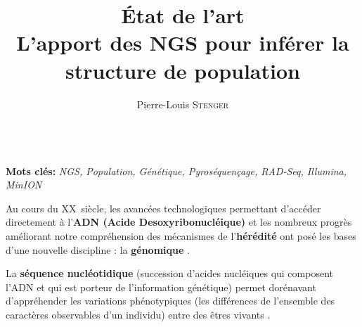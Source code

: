 \documentclass[a4paper,11pt,twoside]{report}
\title{{\Huge État de l'art}\\[3pc]L'apport des NGS pour inférer la structure de population}
\author{Pierre-Louis \textsc{Stenger}}
\date{}
\begin{document}
	
\onehalfspacing %



\frontmatter

\maketitle 

\listoffigures  %

\mainmatter





~~\\
\textbf{Mots clés:} \emph{NGS, Population, Génétique, Pyroséquençage, RAD-Seq, Illumina, MinION}
~~\\

\newpage

Au cours du \textsc{XX}\ieme~siècle, les avancées technologiques permettant d’accéder directement à l’\textbf{ADN (Acide Desoxyribonucléique)} et les nombreux progrès améliorant notre compréhension des mécanismes de l’\textbf{hérédité} ont posé les bases d’une nouvelle discipline : la \textbf{génomique} \citep{eggen2003approches}. 

La \textbf{séquence nucléotidique} (succession d'acides nucléiques qui composent l'ADN et qui est porteur de l'information génétique) permet dorénavant d'appréhender les variations phénotypiques (les différences de l'ensemble des caractères observables d'un individu) entre des êtres vivants \citep{champe1962reversal}.
\end{document}

